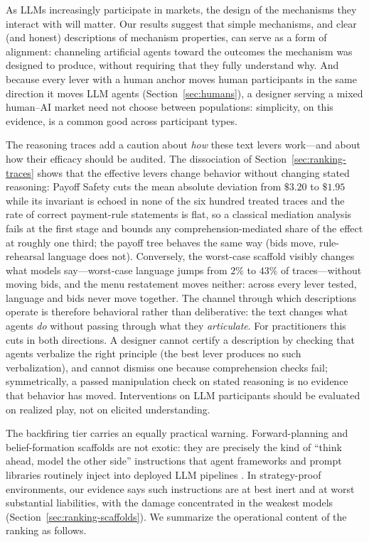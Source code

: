 As LLMs increasingly participate in markets, the design of the mechanisms they interact with will matter. Our results suggest that simple mechanisms, and clear (and honest) descriptions of mechanism properties, can serve as a form of alignment: channeling artificial agents toward the outcomes the mechanism was designed to produce, without requiring that they fully understand why. And because every lever with a human anchor moves human participants in the same direction it moves LLM agents (Section~\ref{sec:humans}), a designer serving a mixed human--AI market need not choose between populations: simplicity, on this evidence, is a common good across participant types.

The reasoning traces add a caution about \emph{how} these text levers work---and about how their efficacy should be audited. The dissociation of Section~\ref{sec:ranking-traces} shows that the effective levers change behavior without changing stated reasoning: Payoff Safety cuts the mean absolute deviation from $\$3.20$ to $\$1.95$ while its invariant is echoed in none of the six hundred treated traces and the rate of correct payment-rule statements is flat, so a classical mediation analysis fails at the first stage and bounds any comprehension-mediated share of the effect at roughly one third; the payoff tree behaves the same way (bids move, rule-rehearsal language does not). Conversely, the worst-case scaffold visibly changes what models say---worst-case language jumps from $2\%$ to $43\%$ of traces---without moving bids, and the menu restatement moves neither: across every lever tested, language and bids never move together. The channel through which descriptions operate is therefore behavioral rather than deliberative: the text changes what agents \emph{do} without passing through what they \emph{articulate}. For practitioners this cuts in both directions. A designer cannot certify a description by checking that agents verbalize the right principle (the best lever produces no such verbalization), and cannot dismiss one because comprehension checks fail; symmetrically, a passed manipulation check on stated reasoning is no evidence that behavior has moved. Interventions on LLM participants should be evaluated on realized play, not on elicited understanding.

The backfiring tier carries an equally practical warning. Forward-planning and belief-formation scaffolds are not exotic: they are precisely the kind of ``think ahead, model the other side'' instructions that agent frameworks and prompt libraries routinely inject into deployed LLM pipelines \citep{fish2024algorithmic}. In strategy-proof environments, our evidence says such instructions are at best inert and at worst substantial liabilities, with the damage concentrated in the weakest models (Section~\ref{sec:ranking-scaffolds}). We summarize the operational content of the ranking as follows.

